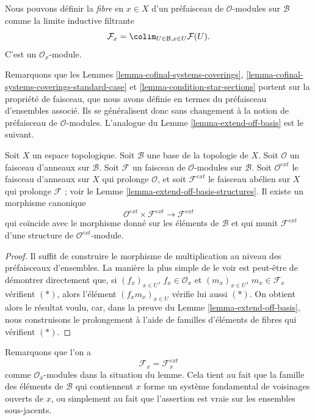 \noindent
Nous pouvons définir la {\it fibre} en $x \in X$
d'un préfaisceau de $\mathcal{O}$-modules sur $\mathcal{B}$
comme la limite inductive filtrante
$$
\mathcal{F}_x = \colim_{U\in \mathcal{B}, x\in U} \mathcal{F}(U).
$$
C'est un $\mathcal{O}_x$-module.

\medskip\noindent
Remarquons que les Lemmes \ref{lemma-cofinal-systems-coverings},
\ref{lemma-cofinal-systems-coverings-standard-case} et
\ref{lemma-condition-star-sections} portent sur la propriété de faisceau,
que nous avons définie en termes du préfaisceau
d'ensembles associé. Ils se généralisent donc sans changement à la notion
de préfaisceau de $\mathcal{O}$-modules. L'analogue du
Lemme \ref{lemma-extend-off-basis} est le suivant.

\begin{lemma}
\label{lemma-extend-off-basis-module}
Soit $X$ un espace topologique.
Soit $\mathcal{B}$ une base de la topologie de $X$.
Soit $\mathcal{O}$ un faisceau d'anneaux sur $\mathcal{B}$.
Soit $\mathcal{F}$ un faisceau de $\mathcal{O}$-modules
sur $\mathcal{B}$. Soit $\mathcal{O}^{ext}$ le faisceau
d'anneaux sur $X$ qui prolonge $\mathcal{O}$, et soit
$\mathcal{F}^{ext}$ le faisceau abélien sur $X$ qui prolonge
$\mathcal{F}$ ; voir le Lemme \ref{lemma-extend-off-basis-structures}.
Il existe un morphisme canonique
$$
\mathcal{O}^{ext} \times \mathcal{F}^{ext}
\longrightarrow
\mathcal{F}^{ext}
$$
qui coïncide avec le morphisme donné sur les éléments de $\mathcal{B}$
et qui munit $\mathcal{F}^{ext}$ d'une structure
de $\mathcal{O}^{ext}$-module.
\end{lemma}

\begin{proof}
Il suffit de construire le morphisme de multiplication
au niveau des préfaisceaux d'ensembles. La manière la plus simple
de le voir est peut-être de démontrer directement que, si
$(f_x)_{x \in U}$, $f_x \in \mathcal{O}_x$
et
$(m_x)_{x \in U}$, $m_x \in \mathcal{F}_x$
vérifient $(*)$, alors l'élément
$(f_xm_x)_{x \in U}$ vérifie lui aussi $(*)$.
On obtient alors le résultat voulu, car, dans la preuve
du Lemme \ref{lemma-extend-off-basis}, nous construisons le prolongement
à l'aide de familles d'éléments de fibres qui vérifient $(*)$.
\end{proof}

\noindent
Remarquons que l'on a
$$
\mathcal{F}_x = \mathcal{F}_x^{ext}
$$
comme $\mathcal{O}_x$-modules dans la situation du lemme.
Cela tient au fait que la famille des éléments de $\mathcal{B}$ qui contiennent
$x$ forme un système fondamental de voisinages ouverts de $x$, ou
simplement au fait que l'assertion est vraie sur les ensembles sous-jacents.

